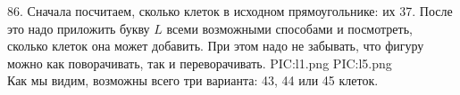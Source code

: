 86. Сначала посчитаем, сколько клеток в исходном прямоугольнике: их 37. После это надо приложить букву $L$ всеми возможными способами и посмотреть, сколько клеток она может добавить. При этом надо не забывать, что фигуру можно как поворачивать, так и переворачивать.
{{PIC:l1.png}}
{{PIC:l5.png}}\\
Как мы видим, возможны всего три варианта: 43, 44 или 45 клеток.
\newpage\noindent
